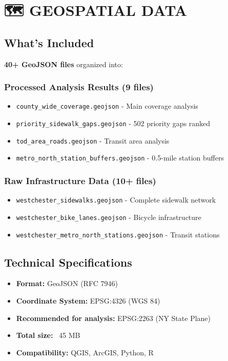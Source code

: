 \documentclass[11pt,letterpaper]{article}
\begin{document}
\section{🗺️ GEOSPATIAL DATA} \label{gis-integration}

\subsection{What's Included}
\textbf{40+ GeoJSON files} organized into:

\subsubsection{Processed Analysis Results (9 files)}
\begin{itemize}
    \item \texttt{county\_wide\_coverage.geojson} - Main coverage analysis
    \item \texttt{priority\_sidewalk\_gaps.geojson} - 502 priority gaps ranked
    \item \texttt{tod\_area\_roads.geojson} - Transit area analysis
    \item \texttt{metro\_north\_station\_buffers.geojson} - 0.5-mile station buffers
\end{itemize}

\subsubsection{Raw Infrastructure Data (10+ files)}
\begin{itemize}
    \item \texttt{westchester\_sidewalks.geojson} - Complete sidewalk network
    \item \texttt{westchester\_bike\_lanes.geojson} - Bicycle infrastructure
    \item \texttt{westchester\_metro\_north\_stations.geojson} - Transit stations
\end{itemize}

\subsection{Technical Specifications}
\begin{itemize}
    \item \textbf{Format:} GeoJSON (RFC 7946)
    \item \textbf{Coordinate System:} EPSG:4326 (WGS 84)
    \item \textbf{Recommended for analysis:} EPSG:2263 (NY State Plane)
    \item \textbf{Total size:} ~45 MB
    \item \textbf{Compatibility:} QGIS, ArcGIS, Python, R
\end{itemize}
\end{document}
